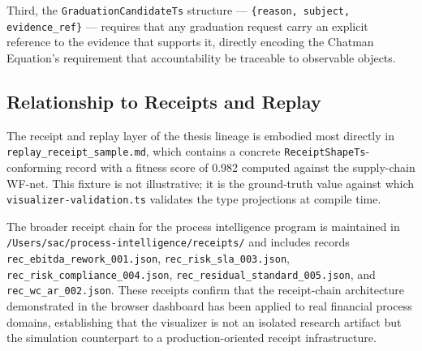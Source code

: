 Third, the \texttt{GraduationCandidateTs} structure — \texttt{\{reason, subject, evidence\_ref\}}
— requires that any graduation request carry an explicit reference to the evidence that supports
it, directly encoding the Chatman Equation's requirement that accountability be traceable to
observable objects.

\subsection{Relationship to Receipts and Replay}
\label{sec:experiments-visualizer-lineage-receipts}

The receipt and replay layer of the thesis lineage is embodied most directly in
\texttt{replay\_receipt\_sample.md}, which contains a concrete \texttt{ReceiptShapeTs}-conforming
record with a fitness score of 0.982 computed against the supply-chain WF-net. This fixture is
not illustrative; it is the ground-truth value against which \texttt{visualizer-validation.ts}
validates the type projections at compile time.

The broader receipt chain for the process intelligence program is maintained in
\texttt{/Users/sac/process-intelligence/receipts/} and includes records
\texttt{rec\_ebitda\_rework\_001.json}, \texttt{rec\_risk\_sla\_003.json},
\texttt{rec\_risk\_compliance\_004.json}, \texttt{rec\_residual\_standard\_005.json}, and
\texttt{rec\_wc\_ar\_002.json}. These receipts confirm that the receipt-chain architecture
demonstrated in the browser dashboard has been applied to real financial process domains,
establishing that the visualizer is not an isolated research artifact but the simulation
counterpart to a production-oriented receipt infrastructure.
